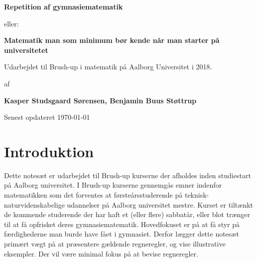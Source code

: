 



\author{Kasper Studsgaard Sørensen, Benjamin Buus Støttrup}

\pagestyle{plain}
\begin{titlepage}
    \begin{center}
        \vspace*{1cm}
        \Huge
        \textbf{Repetition af gymnasiematematik}
 
        \vspace{0.5cm}
        \Large
         eller:
         \vspace{0.5cm}

        
        \Huge
        \textbf{Matematik man som minimum bør kende når man starter på universitetet}
        
        \vspace{0.5cm}
        \large
        Udarbejdet til Brush-up i matematik på Aalborg Universitet i 2018.
        \vspace{1.5cm}

        af 

        \vspace{1.5cm}
        \textbf{Kasper Studsgaard Sørensen, Benjamin Buus Støttrup}

        \vfill
        Senest opdateret \today
        \vspace{2cm}
 
      
        
        
    \end{center}
    \doclicenseThis
 \end{titlepage}



\tableofcontents
\chapter*{Introduktion}\normalsize
Dette notesæt er udarbejdet til Brush-up kurserne der afholdes inden studiestart på Aalborg universitet. I Brush-up kurserne gennemgås emner indenfor matematikken som det forventes at førsteårsstuderende på teknisk-naturvidenskabelige udannelser på Aalborg universitet mestre. Kurset er tiltænkt de kommende studerende der har haft et (eller flere) sabbatår, eller blot trænger til at få opfrisket deres gymnasiematematik. Hovedfokuset er på at få styr på færdighederne man burde have fået i gymnasiet. Derfor lægger dette notesæt primært vægt på at præsentere gældende regneregler, og vise illustrative eksempler. Der vil være minimal fokus på at bevise regneregler. 

